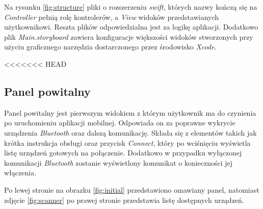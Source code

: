 Na rysunku \ref{fig:structure} pliki o rozszerzeniu \textit{swift}, których nazwy kończą się na \textit{Controller} pełnią rolę kontrolerów, a \textit{View} widoków przedstawianych użytkownikowi. Reszta plików odpowiedzialna jest za logikę aplikacji. Dodatkowo plik \textit{Main.storyboard} zawiera konfiguracje większości widoków stworzonych przy użyciu graficznego narzędzia dostarczonego przez środowisko \textit{Xcode}.

<<<<<<< HEAD
\subsection{Panel powitalny}
Panel powitalny jest pierwszym widokiem z którym użytkownik ma do czynienia po uruchomieniu aplikacji mobilnej. Odpowiada on za poprawne wykrycie urządzenia \textit{Bluetooth} oraz dalszą komunikację. Składa się z elementów takich jak krótka instrukcja obsługi oraz przycisk \textit{Connect}, który po wciśnięciu wyświetla listę urządzeń gotowych na połączenie. Dodatkowo w przypadku wyłączonej komunikacji \textit{Bluetooth} zostanie wyświetlony komunikat o konieczności jej włączenia. 

\newpage

Po lewej stronie na obrazku \ref{fig:initial} przedstawiono omawiany panel, natomiast zdjęcie \ref{fig:scanner} po prawej stronie przedstawia listę dostępnych urządzeń.

